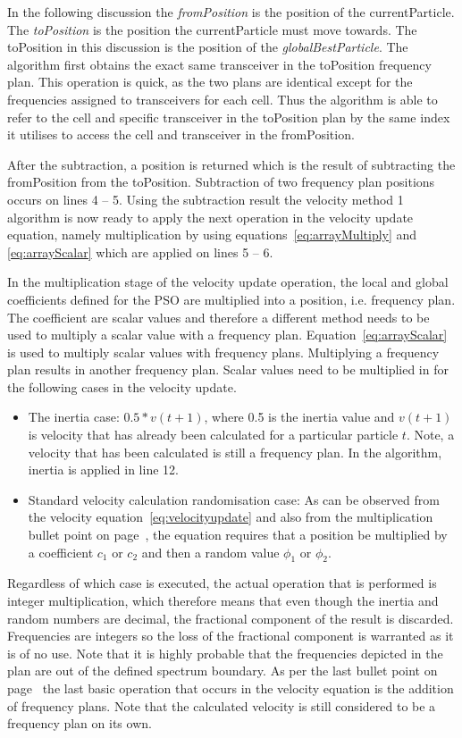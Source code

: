 In the following discussion the \emph{fromPosition} is the position of the currentParticle. The \emph{toPosition} is the position the currentParticle must move towards. The toPosition in this discussion is the position of the \emph{globalBestParticle}.
The algorithm first obtains the exact same transceiver in the toPosition frequency plan. This operation is quick, as the two plans are identical except for the frequencies assigned to transceivers for each cell. Thus the algorithm is able to refer to the cell and specific transceiver in the toPosition plan by the same index it utilises to access the cell and transceiver in the fromPosition.

After the subtraction, a position is returned which is the result of subtracting the fromPosition from the toPosition. Subtraction of two frequency plan positions occurs on lines 4 -- 5. Using the subtraction result the velocity method 1 algorithm is now ready to apply the next operation in the velocity update equation, namely multiplication by using equations~\ref{eq:arrayMultiply} and \ref{eq:arrayScalar} which are applied on lines 5 -- 6.

In the multiplication stage of the velocity update operation, the local and global coefficients defined for the \gls{PSO} are multiplied into a position, i.e. frequency plan. The coefficient are scalar values and therefore a different method needs to be used to multiply a scalar value with a frequency plan. Equation~\ref{eq:arrayScalar} is used to multiply scalar values with frequency plans. Multiplying a frequency plan results in another frequency plan. Scalar values need to be multiplied in for the following cases in the velocity update.
\begin{itemize}
\item The inertia case: $0.5 * v(t+1)$, where 0.5 is the inertia value and $v(t+1)$ is velocity that has already been calculated for a particular particle $t$. Note, a velocity that has been calculated is still a frequency plan. In the algorithm, inertia is applied in line 12.
\item Standard velocity calculation randomisation case: As can be observed from the velocity equation~\ref{eq:velocityupdate} and also from the multiplication bullet point on page~\pageref{lst:velocitybreakup}, the equation requires that a position be multiplied by a coefficient $c_1$ or $c_2$ and then a random value $\phi_1$ or $\phi_2$. 
\end{itemize}

Regardless of which case is executed, the actual operation that is performed is integer multiplication, which therefore means that even though the inertia and random numbers are decimal, the fractional component of the result is discarded. Frequencies are integers so the loss of the fractional component is warranted as it is of no use. Note that it is highly probable that the frequencies depicted in the plan are out of the defined spectrum boundary. As per the last bullet point on page~\pageref{lst:velocitybreakup} the last basic operation that occurs in the velocity equation is the addition of frequency plans. Note that the calculated velocity is still considered to be a frequency plan on its own.

